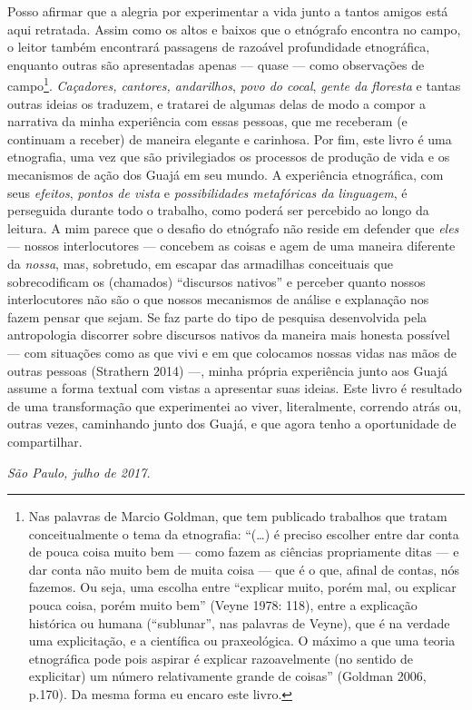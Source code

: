 Posso afirmar que a alegria por experimentar a vida junto a tantos
amigos está aqui retratada. Assim como os altos e baixos que o etnógrafo
encontra no campo, o leitor também encontrará passagens de razoável
profundidade etnográfica, enquanto outras são apresentadas apenas ---
quase --- como observações de campo\footnote{Nas palavras de Marcio
  Goldman, que tem publicado trabalhos que tratam conceitualmente o tema
  da etnografia: ``(\ldots{}) é preciso escolher entre dar conta de pouca
  coisa muito bem --- como fazem as ciências propriamente ditas --- e dar
  conta não muito bem de muita coisa --- que é o que, afinal de contas,
  nós fazemos. Ou seja, uma escolha entre ``explicar muito, porém mal,
  ou explicar pouca coisa, porém muito bem'' (Veyne 1978: 118), entre a
  explicação histórica ou humana (``sublunar'', nas palavras de Veyne),
  que é na verdade uma explicitação, e a científica ou praxeológica. O
  máximo a que uma teoria etnográfica pode pois aspirar é explicar
  razoavelmente (no sentido de explicitar) um número relativamente
  grande de coisas'' (Goldman 2006, p.170). Da mesma forma eu encaro
  este livro.}. \emph{Caçadores, cantores, andarilhos}, \emph{povo do
cocal}, \emph{gente da floresta} e tantas outras ideias os traduzem, e
tratarei de algumas delas de modo a compor a narrativa da minha
experiência com essas pessoas, que me receberam (e continuam a receber)
de maneira elegante e carinhosa. Por fim, este livro é uma etnografia,
uma vez que são privilegiados os processos de produção de vida e os
mecanismos de ação dos Guajá em seu mundo. A experiência
etnográfica, com seus \emph{efeitos}, \emph{pontos de vista} e
\emph{possibilidades metafóricas da linguagem}, é perseguida durante
todo o trabalho, como poderá ser percebido ao longo da leitura. A mim
parece que o desafio do etnógrafo não reside em defender que \emph{eles}
--- nossos interlocutores --- concebem as coisas e agem de uma maneira
diferente da \emph{nossa}, mas, sobretudo, em escapar das armadilhas
conceituais que sobrecodificam os (chamados) ``discursos nativos'' e
perceber quanto nossos interlocutores não são o que nossos mecanismos de
análise e explanação nos fazem pensar que sejam. Se faz parte do tipo de
pesquisa desenvolvida pela antropologia discorrer sobre discursos
nativos da maneira mais honesta possível --- com situações como as que
vivi e em que colocamos nossas vidas nas mãos de outras pessoas
(Strathern 2014) ---, minha própria experiência junto aos Guajá assume a
forma textual com vistas a apresentar suas ideias. Este livro é
resultado de uma transformação que experimentei ao viver, literalmente,
correndo atrás ou, outras vezes, caminhando junto dos Guajá, e que agora
tenho a oportunidade de compartilhar.

\medskip
\begin{flushright}
\emph{São Paulo, julho de 2017.}
\end{flushright}
